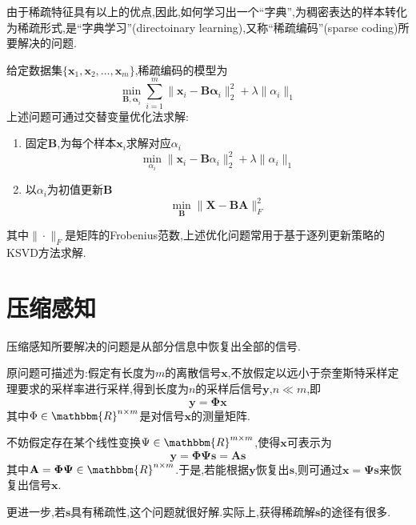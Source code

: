由于稀疏特征具有以上的优点,因此,如何学习出一个``字典'',为稠密表达的样本转化为稀疏形式,是``字典学习''(directoinary learning),又称``稀疏编码''(sparse coding)所要解决的问题.

给定数据集$\{\mathbf{x}_1,\mathbf{x}_2,\dots,\mathbf{x}_m\}$,稀疏编码的模型为
\begin{equation}
\min_{\mathbf{B,\alpha}_i}\sum_{i=1}^m\|\mathbf{x}_i-\mathbf{B\alpha}_i\|_2^2+\lambda\|\alpha_i\|_1
\end{equation}
上述问题可通过交替变量优化法求解:
\begin{enumerate}
\item 固定$\mathbf{B}$,为每个样本$\mathbf{x}_i$求解对应$\alpha_i$
    \begin{equation}
    \min_{\alpha_i}\|\mathbf{x}_i-\mathbf{B}\alpha_i\|_2^2+\lambda\|\alpha_i\|_1
    \end{equation}
\item 以$\alpha_i$为初值更新$\mathbf{B}$
    \begin{equation}
    \min_{\mathbf{B}}\|\mathbf{X-BA}\|_F^2
    \end{equation}
\end{enumerate}
其中$\|\cdot\|_F$是矩阵的Frobenius范数,上述优化问题常用于基于逐列更新策略的KSVD方法求解.

\section{压缩感知}

压缩感知所要解决的问题是从部分信息中恢复出全部的信号.

原问题可描述为:假定有长度为$m$的离散信号$\mathbf{x}$,不放假定以远小于奈奎斯特采样定理要求的采样率进行采样,得到长度为$n$的采样后信号$\mathbf{y}$,$n\ll m$,即
\begin{equation}
\mathbf{y=\Phi x}
\end{equation}
其中$\Phi\in \mathbbm{R}^{n\times m}$是对信号$\mathbf{x}$的测量矩阵.

不妨假定存在某个线性变换$\Psi\in\mathbbm{R}^{m\times m}$,使得$\mathbf{x}$可表示为
\begin{equation}
\mathbf{y=\Phi\Psi s=As}
\end{equation}
其中$\mathbf{A=\Phi\Psi}\in\mathbbm{R}^{n\times m}$.于是,若能根据$\mathbf{y}$恢复出$\mathbf{s}$,则可通过$\mathbf{x=\Psi s}$来恢复出信号$\mathbf{x}$.

更进一步,若$\mathbf{s}$具有稀疏性,这个问题就很好解.实际上,获得稀疏解$\mathbf{s}$的途径有很多.

